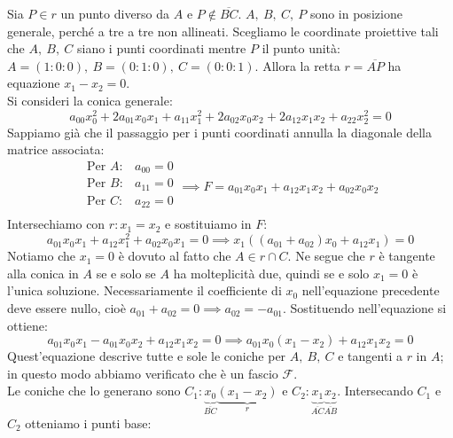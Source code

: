 \begin{demonstration}
	Sia $P\in r$ un punto diverso da $A$ e $P\notin\overline{BC}$. $A,\ B,\ C,\ P$ sono in posizione generale, perché a tre a tre non allineati. Scegliamo le coordinate proiettive tali che $A,\ B,\ C$ siano i punti coordinati mentre $P$ il punto unità: $A=(1\colon 0\colon 0),\ B=(0\colon 1\colon 0),\ C=(0\colon 0\colon1)$.
	Allora la retta $r=\overline{AP}$ ha equazione $x_1-x_2=0$.\\
	Si consideri la conica generale:
	\begin{equation*}
		a_{00}x_0^2+2a_{01}x_0x_1+a_{11}x_1^2+2a_{02}x_0x_2+2a_{12}x_1x_2+a_{22}x_2^2=0
	\end{equation*}
	Sappiamo già che il passaggio per i punti coordinati annulla la diagonale della matrice associata:
	\begin{equation*}
		\begin{array}{ll}
			\text{Per } A \colon & a_{00}=0 \\
			\text{Per } B \colon & a_{11}=0 \\
			\text{Per } C \colon & a_{22}=0 \\
		\end{array}
	\implies F=a_{01}x_0x_1+a_{12}x_1x_2+a_{02}x_0x_2
	\end{equation*}
	Intersechiamo con $r\colon x_1=x_2$ e sostituiamo in $F$:
	\begin{equation*}
		a_{01}x_0x_1 +a_{12}x_1^2+a_{02}x_0x_1=0\implies x_1((a_{01}+a_{02})x_0+a_{12}x_1)=0
	\end{equation*}
	Notiamo che $x_1=0$ è dovuto al fatto che $A\in r\cap C$. Ne segue che $r$ è tangente alla conica in $A$ se e solo se $A$ ha molteplicità due, quindi se e solo $x_1=0$ è l'unica soluzione. Necessariamente il coefficiente di $x_0$ nell'equazione precedente deve essere nullo, cioè $a_{01}+a_{02}=0\implies a_{02}=-a_{01}$. Sostituendo nell'equazione si ottiene:
		\begin{equation*}
			a_{01}x_0x_1 -a_{01}x_0x_2 + a_{12}x_1x_2=0 \implies a_{01}x_0(x_1-x_2) + a_{12}x_1x_2=0
		\end{equation*}
	Quest'equazione descrive tutte e sole le coniche per $A,\ B,\ C$ e tangenti a $r$ in $A$; in questo modo abbiamo verificato che è un fascio $\mathcal{F}$.\\
	Le coniche che lo generano sono $C_1\colon \underbrace{x_0}_{\overline{BC}} \underbrace{(x_1-x_2)}_{r}$ e $C_2\colon \underbrace{x_1}_{\overline{AC}} \underbrace{x_2}_{\overline{AB}}$. Intersecando $C_1$ e $C_2$ otteniamo i punti base:

\end{demonstration}
